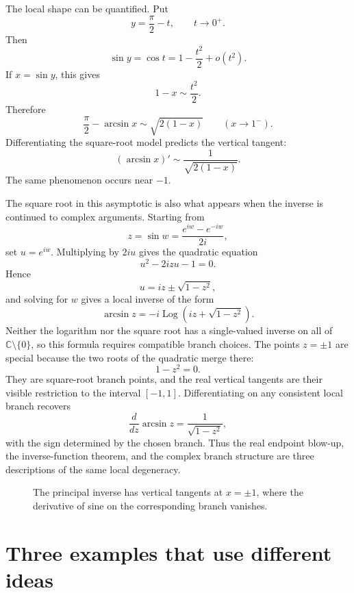 The local shape can be quantified.  Put
\[
  y=\frac\pi2-t,
  \qquad t\to0^+.
\]
Then
\[
  \sin y=\cos t
  =1-\frac{t^2}{2}+o(t^2).
\]
If \(x=\sin y\), this gives
\[
  1-x\sim\frac{t^2}{2}.
\]
Therefore
\[
  \boxed{
  \frac\pi2-\arcsin x
  \sim\sqrt{2(1-x)}
  \qquad(x\to1^-).}
\]
Differentiating the square-root model predicts the vertical tangent:
\[
  (\arcsin x)'
  \sim\frac1{\sqrt{2(1-x)}}.
\]
The same phenomenon occurs near \(-1\).

The square root in this asymptotic is also what appears when the inverse is continued to complex arguments.  Starting from
\[
  z=\sin w=\frac{e^{iw}-e^{-iw}}{2i},
\]
set \(u=e^{iw}\).  Multiplying by \(2iu\) gives the quadratic equation
\[
  u^2-2izu-1=0.
\]
Hence
\[
  u=iz\pm\sqrt{1-z^2},
\]
and solving for \(w\) gives a local inverse of the form
\[
  \boxed{
  \arcsin z
  =-i\operatorname{Log}\left(iz+\sqrt{1-z^2}\right).}
\]
Neither the logarithm nor the square root has a single-valued inverse on all of \(\mathbb C\setminus\{0\}\), so this formula requires compatible branch choices.  The points \(z=\pm1\) are special because the two roots of the quadratic merge there:
\[
  1-z^2=0.
\]
They are square-root branch points, and the real vertical tangents are their visible restriction to the interval \([-1,1]\).  Differentiating on any consistent local branch recovers
\[
  \frac{d}{dz}\arcsin z=\frac1{\sqrt{1-z^2}},
\]
with the sign determined by the chosen branch.  Thus the real endpoint blow-up, the inverse-function theorem, and the complex branch structure are three descriptions of the same local degeneracy.

\begin{figure}[H]
\centering
{}
\caption{The principal inverse has vertical tangents at \(x=\pm1\), where the derivative of sine on the corresponding branch vanishes.}
\end{figure}

\section{Three examples that use different ideas}

